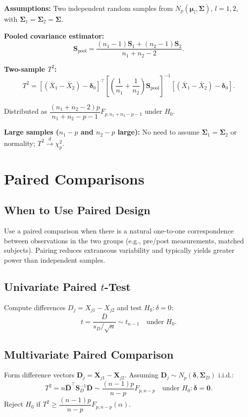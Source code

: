 \documentclass[12pt, a4paper]{article}
\newcommand{\Xbar}{\bar{X}}
\newcommand{\muv}{\boldsymbol{\mu}}
\newcommand{\Sig}{\boldsymbol{\Sigma}}
\newcommand{\Np}{N_p}
\begin{document}
\textbf{Assumptions:} Two independent random samples from $\Np(\muv_l,\Sig)$, $l=1,2$, with $\Sig_1 = \Sig_2 = \Sig$.

\textbf{Pooled covariance estimator:}
\[
  \mathbf{S}_\text{pool} = \frac{(n_1-1)\mathbf{S}_1 + (n_2-1)\mathbf{S}_2}{n_1+n_2-2}.
\]

\textbf{Two-sample $T^2$:}
\[
  T^2 = \left[(\Xbar_1-\Xbar_2)-\boldsymbol{\delta}_0\right]^{\top}
        \left[\left(\frac{1}{n_1}+\frac{1}{n_2}\right)\mathbf{S}_\text{pool}\right]^{-1}
        \left[(\Xbar_1-\Xbar_2)-\boldsymbol{\delta}_0\right].
\]

Distributed as $\dfrac{(n_1+n_2-2)p}{n_1+n_2-p-1}F_{p,n_1+n_2-p-1}$ under $H_0$.

\textbf{Large samples ($n_1-p$ and $n_2-p$ large):} No need to assume $\Sig_1=\Sig_2$ or normality; $T^2 \xrightarrow{d} \chi^2_p$.

\section{Paired Comparisons}

\subsection{When to Use Paired Design}

Use a paired comparison when there is a natural one-to-one correspondence between observations in the two groups (e.g., pre/post measurements, matched subjects). Pairing reduces extraneous variability and typically yields greater power than independent samples.

\subsection{Univariate Paired $t$-Test}

Compute differences $D_j = X_{j1} - X_{j2}$ and test $H_0: \delta = 0$:
\[
  t = \frac{\bar{D}}{s_D/\sqrt{n}} \sim t_{n-1} \quad\text{under }H_0.
\]

\subsection{Multivariate Paired Comparison}

Form difference vectors $\mathbf{D}_j = \mathbf{X}_{j1} - \mathbf{X}_{j2}$. Assuming $\mathbf{D}_j \sim \Np(\boldsymbol{\delta}, \Sig_D)$ i.i.d.:
\[
  T^2 = n\bar{\mathbf{D}}^{\top}\mathbf{S}_D^{-1}\bar{\mathbf{D}} \sim \frac{(n-1)p}{n-p}F_{p,n-p} \quad\text{under }H_0: \boldsymbol{\delta}=\mathbf{0}.
\]
Reject $H_0$ if $T^2 \geq \dfrac{(n-1)p}{n-p}F_{p,n-p}(\alpha)$.
\end{document}
